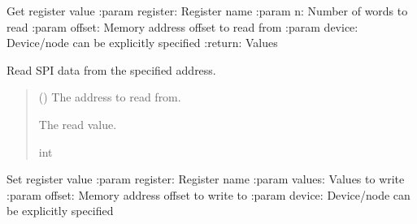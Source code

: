 \documentclass[letterpaper,10pt,english]{sphinxmanual}
\begin{document}
\begin{fulllineitems}
\begin{fulllineitems}
\end{fulllineitems}



\begin{fulllineitems}

\pysigstartsignatures
{}
\pysigstopsignatures
\sphinxAtStartPar
Get register value
:param register: Register name
:param n: Number of words to read
:param offset: Memory address offset to read from
:param device: Device/node can be explicitly specified
:return: Values

\end{fulllineitems}



\begin{fulllineitems}

\pysigstartsignatures
{}
\pysigstopsignatures
\sphinxAtStartPar
Read SPI data from the specified address.
\begin{quote}\begin{description}
\sphinxAtStartPar
{} () \textendash{} The address to read from.

\sphinxAtStartPar
The read value.

\sphinxAtStartPar
int

\end{description}\end{quote}

\end{fulllineitems}



\begin{fulllineitems}

\pysigstartsignatures
{}
\pysigstopsignatures
\sphinxAtStartPar
Set register value
:param register: Register name
:param values: Values to write
:param offset: Memory address offset to write to
:param device: Device/node can be explicitly specified


\end{fulllineitems}
\end{fulllineitems}
\end{document}

